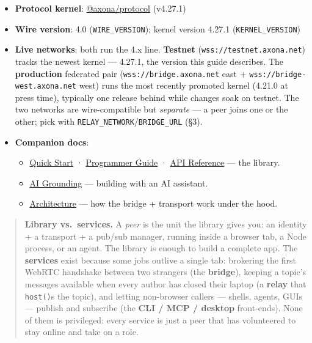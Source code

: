 \documentclass[
  nobib]{tufte-handout}
\providecommand{\tightlist}{%
  \setlength{\itemsep}{0pt}\setlength{\parskip}{0pt}}
\begin{document}
\begin{itemize}
\tightlist
\item
  \textbf{Protocol kernel}:
  \href{https://github.com/axona-net/axona-protocol}{@axona/protocol}
  (v4.27.1)
\item
  \textbf{Wire version}: 4.0 (\texttt{WIRE\_VERSION}); kernel version
  4.27.1 (\texttt{KERNEL\_VERSION})
\item
  \textbf{Live networks}: both run the 4.x line. \textbf{Testnet}
  (\texttt{wss://testnet.axona.net}) tracks the newest kernel ---
  4.27.1, the version this guide describes. The \textbf{production}
  federated pair (\texttt{wss://bridge.axona.net} east +
  \texttt{wss://bridge-west.axona.net} west) runs the most recently
  promoted kernel (4.21.0 at press time), typically one release behind
  while changes soak on testnet. The two networks are wire-compatible
  but \emph{separate} --- a peer joins one or the other; pick with
  \texttt{RELAY\_NETWORK}/\texttt{BRIDGE\_URL} (§3).
\item
  \textbf{Companion docs}:

  \begin{itemize}
  \tightlist
  \item
    \href{Quick-Start-v4.27.1.md}{Quick Start} ·
    \href{Axona-Programmer-Guide-v4.27.1.md}{Programmer Guide} ·
    \href{Axona-API-Reference-v4.27.1.md}{API Reference} --- the
    library.
  \item
    \href{Axona-AI-Grounding-v4.27.1.md}{AI Grounding} --- building with
    an AI assistant.
  \item
    \href{../architecture/Axona-Architecture.tex}{Architecture} --- how
    the bridge + transport work under the hood.
  \end{itemize}
\end{itemize}

\begin{quote}
\textbf{Library vs.~services.} A \emph{peer} is the unit the library
gives you: an identity + a transport + a pub/sub manager, running inside
a browser tab, a Node process, or an agent. The library is enough to
build a complete app. The \textbf{services} exist because some jobs
outlive a single tab: brokering the first WebRTC handshake between two
strangers (the \textbf{bridge}), keeping a topic's messages available
when every author has closed their laptop (a \textbf{relay} that
\texttt{host()}s the topic), and letting non-browser callers --- shells,
agents, GUIs --- publish and subscribe (the \textbf{CLI / MCP / desktop}
front-ends). None of them is privileged: every service is just a peer
that has volunteered to stay online and take on a role.
\end{quote}
\end{document}
